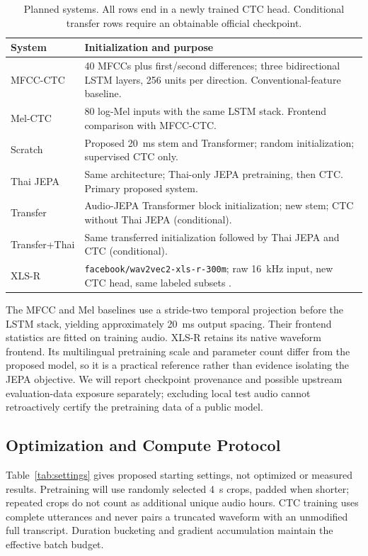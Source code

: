 \begin{table}[t]
\caption{Planned systems. All rows end in a newly trained CTC head. Conditional transfer rows require an obtainable official checkpoint.}
\label{tab:systems}
\centering\footnotesize
\begin{tabularx}{\columnwidth}{@{}l X@{}}
\toprule
System & Initialization and purpose \\
\midrule
MFCC-CTC & 40 MFCCs plus first/second differences; three bidirectional LSTM layers, 256 units per direction. Conventional-feature baseline. \\
Mel-CTC & 80 log-Mel inputs with the same LSTM stack. Frontend comparison with MFCC-CTC. \\
Scratch & Proposed 20~ms stem and Transformer; random initialization; supervised CTC only. \\
Thai JEPA & Same architecture; Thai-only JEPA pretraining, then CTC. Primary proposed system. \\
Transfer & Audio-JEPA Transformer block initialization; new stem; CTC without Thai JEPA (conditional). \\
Transfer+Thai & Same transferred initialization followed by Thai JEPA and CTC (conditional). \\
XLS-R & \texttt{facebook/wav2vec2-xls-r-300m}; raw 16~kHz input, new CTC head, same labeled subsets \cite{babu2022xlsr,xlsrcheckpoint}. \\
\bottomrule
\end{tabularx}
\end{table}

The MFCC and Mel baselines use a stride-two temporal projection before the LSTM stack, yielding approximately 20~ms output spacing. Their frontend statistics are fitted on training audio. XLS-R retains its native waveform frontend. Its multilingual pretraining scale and parameter count differ from the proposed model, so it is a practical reference rather than evidence isolating the JEPA objective. We will report checkpoint provenance and possible upstream evaluation-data exposure separately; excluding local test audio cannot retroactively certify the pretraining data of a public model.

\subsection{Optimization and Compute Protocol}
Table~\ref{tab:settings} gives proposed starting settings, not optimized or measured results. Pretraining will use randomly selected 4~s crops, padded when shorter; repeated crops do not count as additional unique audio hours. CTC training uses complete utterances and never pairs a truncated waveform with an unmodified full transcript. Duration bucketing and gradient accumulation maintain the effective batch budget.

